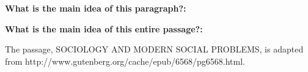 \begin{enumerate}
\begin{linenumbers}
\end{linenumbers}

\textbf{What is the main idea of this paragraph?:} \hrulefill

\hrulefill

\textbf{What is the main idea of this entire passage?:} \hrulefill

\hrulefill

\hrulefill

\sloppy The passage, SOCIOLOGY AND MODERN SOCIAL PROBLEMS, is adapted from http://www.gutenberg.org/cache/epub/6568/pg6568.html. 
\end{enumerate}